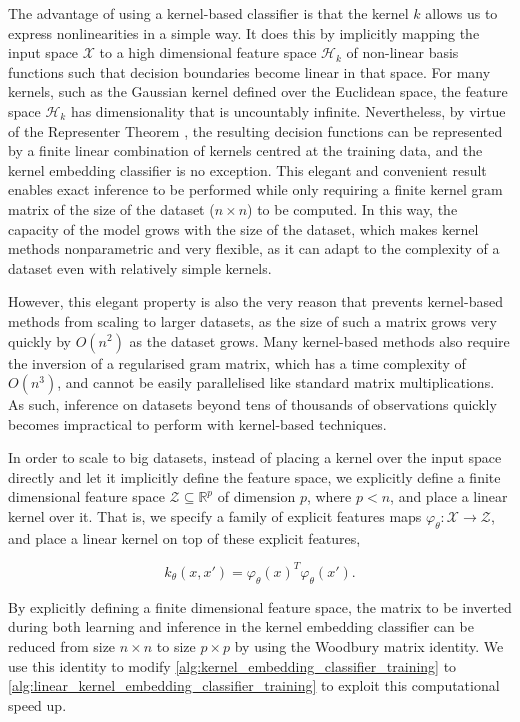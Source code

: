 \documentclass{article}
\begin{document}
		The advantage of using a kernel-based classifier is that the kernel $k$ allows us to express nonlinearities in a simple way. It does this by implicitly mapping the input space $\mathcal{X}$ to a high dimensional feature space $\mathcal{H}_{k}$ of non-linear basis functions such that decision boundaries become linear in that space. For many kernels, such as the Gaussian kernel defined over the Euclidean space, the feature space $\mathcal{H}_{k}$ has dimensionality that is uncountably infinite. Nevertheless, by virtue of the Representer Theorem \citep{kimeldorf1971some}, the resulting decision functions can be represented by a finite linear combination of kernels centred at the training data, and the kernel embedding classifier is no exception. This elegant and convenient result enables exact inference to be performed while only requiring a finite kernel gram matrix of the size of the dataset ($n \times n$) to be computed. In this way, the capacity of the model grows with the size of the dataset, which makes kernel methods nonparametric and very flexible, as it can adapt to the complexity of a dataset even with relatively simple kernels. 
		
		However, this elegant property is also the very reason that prevents kernel-based methods from scaling to larger datasets, as the size of such a matrix grows very quickly by $O(n^{2})$ as the dataset grows. Many kernel-based methods also require the inversion of a regularised gram matrix, which has a time complexity of $O(n^{3})$, and cannot be easily parallelised like standard matrix multiplications. As such, inference on datasets beyond tens of thousands of observations quickly becomes impractical to perform with kernel-based techniques.
		
		In order to scale to big datasets, instead of placing a kernel over the input space directly and let it implicitly define the feature space, we explicitly define a finite dimensional feature space $\mathcal{Z} \subseteq \mathbb{R}^{p}$ of dimension $p$, where $p < n$, and place a linear kernel over it. That is, we specify a family of explicit features maps $\varphi_{\theta} : \mathcal{X} \to \mathcal{Z}$, and place a linear kernel on top of these explicit features,
		
		\begin{equation}
			k_{\theta}(x, x') = \varphi_{\theta}(x)^{T} \varphi_{\theta}(x').
		\end{equation}
		
		By explicitly defining a finite dimensional feature space, the matrix to be inverted during both learning and inference in the kernel embedding classifier can be reduced from size $n \times n$ to size $p \times p$ by using the Woodbury matrix identity. We use this identity to modify \cref{alg:kernel_embedding_classifier_training} to \cref{alg:linear_kernel_embedding_classifier_training} to exploit this computational speed up.
		
\end{document}
